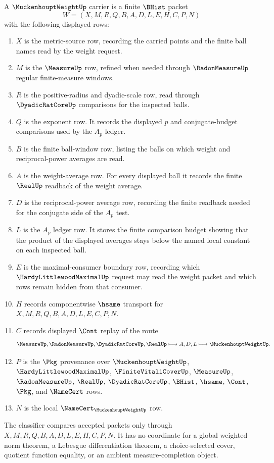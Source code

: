 \begin{definition}
\label{def:muckenhoupt-weight-carrier}
A $\MuckenhouptWeightUp$ carrier is a finite $\BHist$ packet
$$
W=(X,M,R,Q,B,A,D,L,E,H,C,P,N)
$$
with the following displayed rows:
\begin{enumerate}
\item $X$ is the metric-source row, recording the carried points and the finite ball names read by the weight request.
\item $M$ is the $\MeasureUp$ row, refined when needed through $\RadonMeasureUp$ regular finite-measure windows.
\item $R$ is the positive-radius and dyadic-scale row, read through $\DyadicRatCoreUp$ comparisons for the inspected balls.
\item $Q$ is the exponent row. It records the displayed $p$ and conjugate-budget comparisons used by the $A_p$ ledger.
\item $B$ is the finite ball-window row, listing the balls on which weight and reciprocal-power averages are read.
\item $A$ is the weight-average row. For every displayed ball it records the finite $\RealUp$ readback of the weight average.
\item $D$ is the reciprocal-power average row, recording the finite readback needed for the conjugate side of the $A_p$ test.
\item $L$ is the $A_p$ ledger row. It stores the finite comparison budget showing that the product of the displayed averages stays below the named local constant on each inspected ball.
\item $E$ is the maximal-consumer boundary row, recording which $\HardyLittlewoodMaximalUp$ request may read the weight packet and which rows remain hidden from that consumer.
\item $H$ records componentwise $\hsame$ transport for $X,M,R,Q,B,A,D,L,E,C,P,N$.
\item $C$ records displayed $\Cont$ replay of the route
$$
\MeasureUp,\RadonMeasureUp,\DyadicRatCoreUp,\RealUp
\longmapsto
A,D,L
\longmapsto
\MuckenhouptWeightUp .
$$
\item $P$ is the $\Pkg$ provenance over $\MuckenhouptWeightUp$, $\HardyLittlewoodMaximalUp$, $\FiniteVitaliCoverUp$, $\MeasureUp$, $\RadonMeasureUp$, $\RealUp$, $\DyadicRatCoreUp$, $\BHist$, $\hsame$, $\Cont$, $\Pkg$, and $\NameCert$ rows.
\item $N$ is the local $\NameCert_{\MuckenhouptWeightUp}$ row.
\end{enumerate}
The classifier compares accepted packets only through $X,M,R,Q,B,A,D,L,E,H,C,P,N$. It has no coordinate for a global weighted norm theorem, a Lebesgue differentiation theorem, a choice-selected cover, quotient function equality, or an ambient measure-completion object.
\end{definition}

